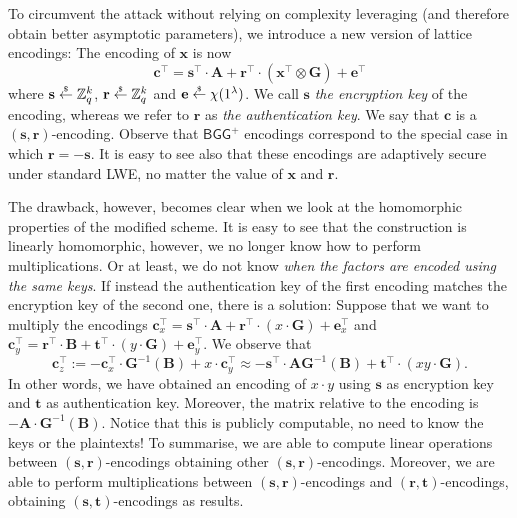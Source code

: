\documentclass{article}
\newcommand{\getsr}{\overset{\raisebox{-1pt}{$\scriptscriptstyle \$$}}{\gets}}
\newcommand{\sample}{\getsr}
\newcommand{\Z}{\mathbb{Z}}
\renewcommand{\sec}{\ensuremath{\lambda}}
\newcommand\bbbone{1}
\begin{document}
To circumvent the attack without relying on complexity leveraging (and therefore obtain better asymptotic parameters), we introduce a new version of lattice encodings: The encoding of $\mathbf{x}$ is now
\[\mathbf{c}^\intercal=\mathbf{s}^\intercal\cdot \mathbf{A}+\mathbf{r}^\intercal\cdot (\mathbf{x}^\intercal\otimes \mathbf{G})+\mathbf{e}^\intercal\]
where $\mathbf{s}\sample\Z_q^k$, $\mathbf{r}\sample\Z_q^k$ and $\mathbf{e}\sample\chi(\bbbone^\sec)$. We call $\mathbf{s}$ \emph{the encryption key} of the encoding, whereas we refer to $\mathbf{r}$ as \emph{the authentication key}. We say that $\mathbf{c}$ is a $(\mathbf{s}, \mathbf{r})$-encoding. Observe that $\mathsf{BGG^+}$ encodings correspond to the special case in which $\mathbf{r}=-\mathbf{s}$. It is easy to see also that these encodings are adaptively secure under standard LWE, no matter the value of $\mathbf{x}$ and $\mathbf{r}$.

The drawback, however, becomes clear when we look at the homomorphic properties of the modified scheme. It is easy to see that the construction is linearly homomorphic, however, we no longer know how to perform multiplications. Or at least, we do not know \emph{when the factors are encoded using the same keys}. If instead the authentication key of the first encoding matches the encryption key of the second one, there is a solution: Suppose that we want to multiply the encodings $\mathbf{c}_x^\intercal=\mathbf{s}^\intercal\cdot \mathbf{A}+\mathbf{r}^\intercal\cdot (x\cdot \mathbf{G})+\mathbf{e}_x^\intercal$ and $\mathbf{c}_y^\intercal=\mathbf{r}^\intercal\cdot \mathbf{B}+\mathbf{t}^\intercal\cdot (y\cdot \mathbf{G})+\mathbf{e}_y^\intercal$. We observe that
\[\mathbf{c}_z^\intercal:=-\mathbf{c}_x^\intercal\cdot \mathbf{G}^{-1}(\mathbf{B})+x\cdot \mathbf{c}_y^\intercal\approx-\mathbf{s}^\intercal\cdot \mathbf{A} \mathbf{G}^{-1}(\mathbf{B})+\mathbf{t}^\intercal \cdot (x y\cdot \mathbf{G}).\]
In other words, we have obtained an encoding of $x\cdot y$ using $\mathbf{s}$ as encryption key and $\mathbf{t}$ as authentication key. Moreover, the matrix relative to the encoding is $-\mathbf{A}\cdot \mathbf{G}^{-1}(\mathbf{B})$. Notice that this is publicly computable, no need to know the keys or the plaintexts! To summarise, we are able to compute linear operations between $(\mathbf{s}, \mathbf{r})$-encodings obtaining other $(\mathbf{s}, \mathbf{r})$-encodings. Moreover, we are able to perform multiplications between $(\mathbf{s}, \mathbf{r})$-encodings and $(\mathbf{r}, \mathbf{t})$-encodings, obtaining $(\mathbf{s}, \mathbf{t})$-encodings as results.
\end{document}
